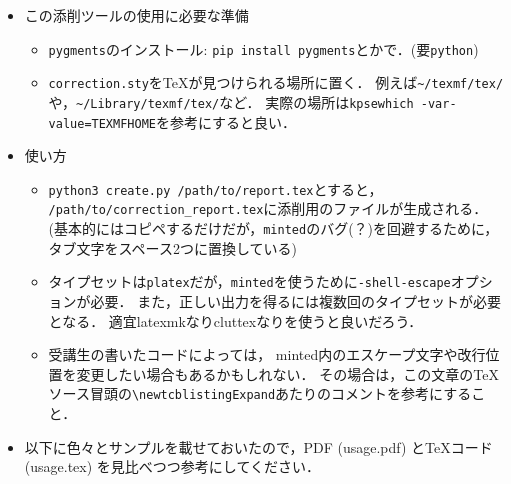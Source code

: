 \documentclass[dvipdfmx]{jsarticle}
\begin{document}
\begin{itemize}
  \item この添削ツールの使用に必要な準備
    \begin{itemize}
      \item \verb|pygments|のインストール: \verb|pip install pygments|とかで．(要\verb|python|)
      \item \verb|correction.sty|を\TeX が見つけられる場所に置く．
        例えば\verb|~/texmf/tex/|や，\verb|~/Library/texmf/tex/|など．
        実際の場所は\verb|kpsewhich -var-value=TEXMFHOME|を参考にすると良い．
    \end{itemize}
  \item 使い方
    \begin{itemize}
      \item \verb|python3 create.py /path/to/report.tex|とすると，
        \verb|/path/to/correction_report.tex|に添削用のファイルが生成される．
        (基本的にはコピペするだけだが，\verb|minted|のバグ(？)を回避するために，タブ文字をスペース2つに置換している)
      \item タイプセットは\verb|platex|だが，\verb|minted|を使うために\verb|-shell-escape|オプションが必要．
        また，正しい出力を得るには複数回のタイプセットが必要となる．
        適宜latexmkなりcluttexなりを使うと良いだろう．
      \item 受講生の書いたコードによっては，
        minted内のエスケープ文字や改行位置を変更したい場合もあるかもしれない．
        その場合は，この文章の\TeX ソース冒頭の\verb|\newtcblistingExpand|あたりのコメントを参考にすること．

    \end{itemize}
  \item 以下に色々とサンプルを載せておいたので，PDF (usage.pdf) と\TeX コード (usage.tex) を見比べつつ参考にしてください．
\end{itemize}

\vspace{30pt}

\end{document}
